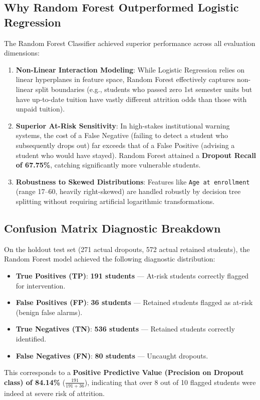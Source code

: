 \documentclass[11pt,a4paper]{article}
\begin{document}
\subsection{Why Random Forest Outperformed Logistic Regression}
The Random Forest Classifier achieved superior performance across all evaluation dimensions:
\begin{enumerate}
    \item \textbf{Non-Linear Interaction Modeling}: While Logistic Regression relies on linear hyperplanes in feature space, Random Forest effectively captures non-linear split boundaries (e.g., students who passed zero 1st semester units but have up-to-date tuition have vastly different attrition odds than those with unpaid tuition).
    \item \textbf{Superior At-Risk Sensitivity}: In high-stakes institutional warning systems, the cost of a False Negative (failing to detect a student who subsequently drops out) far exceeds that of a False Positive (advising a student who would have stayed). Random Forest attained a \textbf{Dropout Recall of 67.75\%}, catching significantly more vulnerable students.
    \item \textbf{Robustness to Skewed Distributions}: Features like \texttt{Age at enrollment} (range 17--60, heavily right-skewed) are handled robustly by decision tree splitting without requiring artificial logarithmic transformations.
\end{enumerate}

\subsection{Confusion Matrix Diagnostic Breakdown}
On the holdout test set (271 actual dropouts, 572 actual retained students), the Random Forest model achieved the following diagnostic distribution:
\begin{itemize}
    \item \textbf{True Positives (TP)}: \textbf{191 students} --- At-risk students correctly flagged for intervention.
    \item \textbf{False Positives (FP)}: \textbf{36 students} --- Retained students flagged as at-risk (benign false alarms).
    \item \textbf{True Negatives (TN)}: \textbf{536 students} --- Retained students correctly identified.
    \item \textbf{False Negatives (FN)}: \textbf{80 students} --- Uncaught dropouts.
\end{itemize}
This corresponds to a \textbf{Positive Predictive Value (Precision on Dropout class) of 84.14\%} ($\frac{191}{191+36}$), indicating that over 8 out of 10 flagged students were indeed at severe risk of attrition.
\end{document}
